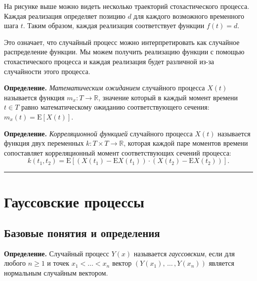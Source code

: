 \documentclass[11pt,a4paper]{article}
\begin{document}
На рисунке выше можно видеть несколько траекторий стохастического
процесса. Каждая реализация определяет позицию \(d\) для каждого
возможного временного шага \(t\). Таким образом, каждая реализация
соответствует функции \(f(t) = d\).

Это означает, что случайный процесс можно интерпретировать как случайное
распределение функции. Мы можем получить реализацию функции с помощью
стохастического процесса и каждая реализация будет различной из-за
случайности этого процесса.

\textbf{Определение.} \emph{Математическим ожиданием} случайного
процесса \(X(t)\) называется функция \(m_x : T \rightarrow \mathbb{R}\),
значение который в каждый момент времени \(t \in T\) равно
математическому ожиданию соответствующего сечения:
\(m_x(t) = \mathrm{E}[X(t)]\).

\textbf{Определение.} \emph{Корреляционной функцией} случайного процесса
\(X(t)\) называется функция двух переменных
\(k : T \times T \rightarrow \mathbb{R}\), которая каждой паре моментов
времени сопоставляет корреляционный момент соответствующих сечений
процесса: \[
  k(t_1, t_2) = \mathrm{E} \left[ \left(X(t_1) - \mathrm{E}X(t_1)\right) \cdot \left(X(t_2) - \mathrm{E}X(t_2)\right) \right].
\]

    \begin{center}\rule{0.5\linewidth}{0.5pt}\end{center}

    \hypertarget{ux433ux430ux443ux441ux441ux43eux432ux441ux43aux438ux435-ux43fux440ux43eux446ux435ux441ux441ux44b}{%
\section{Гауссовские
процессы}\label{ux433ux430ux443ux441ux441ux43eux432ux441ux43aux438ux435-ux43fux440ux43eux446ux435ux441ux441ux44b}}

    \hypertarget{ux431ux430ux437ux43eux432ux44bux435-ux43fux43eux43dux44fux442ux438ux44f-ux438-ux43eux43fux440ux435ux434ux435ux43bux435ux43dux438ux44f}{%
\subsection{Базовые понятия и
определения}\label{ux431ux430ux437ux43eux432ux44bux435-ux43fux43eux43dux44fux442ux438ux44f-ux438-ux43eux43fux440ux435ux434ux435ux43bux435ux43dux438ux44f}}

\textbf{Определение.} Случайный процесс \(Y(x)\) называется
\emph{гауссовским}, если для любого \(n \ge 1\) и точек
\(x_1 < \ldots < x_n\) вектор \((Y(x_1), \, \ldots \, , Y(x_n))\)
является нормальным случайным вектором.
\end{document}
